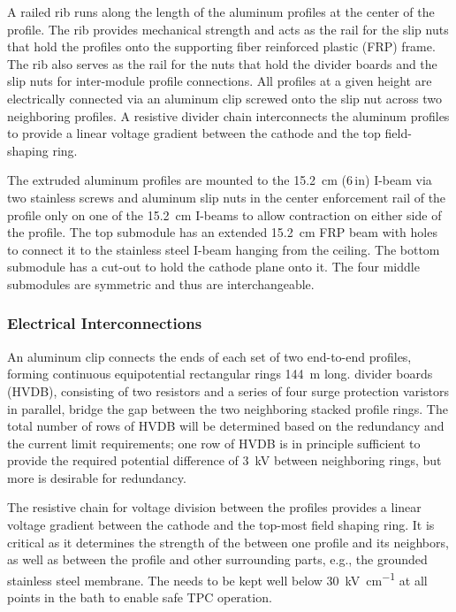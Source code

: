 A railed rib runs along the length of the aluminum profiles at the center of the profile.  The rib provides mechanical strength and acts as the rail for the slip nuts that hold the profiles onto the supporting fiber reinforced plastic (FRP) frame. The rib also serves as the rail for the nuts that hold the \hv divider boards and the slip nuts for inter-module profile connections.  
All profiles at a given height are electrically connected via an aluminum clip screwed onto the slip nut across two neighboring profiles.  A resistive divider chain interconnects the aluminum profiles to provide a linear voltage gradient between the cathode and the top field-shaping ring.   


The extruded aluminum profiles are mounted to the \SI{15.2}{\cm} (\num{6}\,in) I-beam via two stainless screws and aluminum slip nuts in the center enforcement rail of the profile only on one of the \SI{15.2}{\cm} I-beams to allow contraction on either side of the profile. The top submodule has an extended \SI{15.2}{\cm} FRP beam with holes to connect it to the stainless steel I-beam hanging from the ceiling.  The bottom submodule has a cut-out to hold the cathode plane onto it. The four middle submodules are symmetric and thus are interchangeable.


\subsubsection{Electrical Interconnections}

An aluminum clip connects the ends of each set of two end-to-end \fc profiles, forming continuous equipotential rectangular rings  \SI{144}{\m} long. 
  divider boards (HVDB), consisting of two resistors and a series of four surge protection varistors in parallel, bridge the gap between the two neighboring stacked profile rings.   The total number of rows of HVDB will be determined based on the redundancy and the current limit requirements;  one row of HVDB is in principle sufficient to provide the required potential difference of \SI{3}{\kV} between neighboring rings, but more is desirable for redundancy.


The resistive chain for voltage division between the profiles provides a linear voltage gradient between the cathode and the top-most field shaping ring. It is critical as it determines the strength of the \efield between one profile and its neighbors, as well as between the profile and other surrounding parts, e.g., the grounded stainless steel membrane. The \efield needs to be kept well below \SI{30}{\kV\per\cm} at all points in the \lar bath to enable safe TPC operation.

